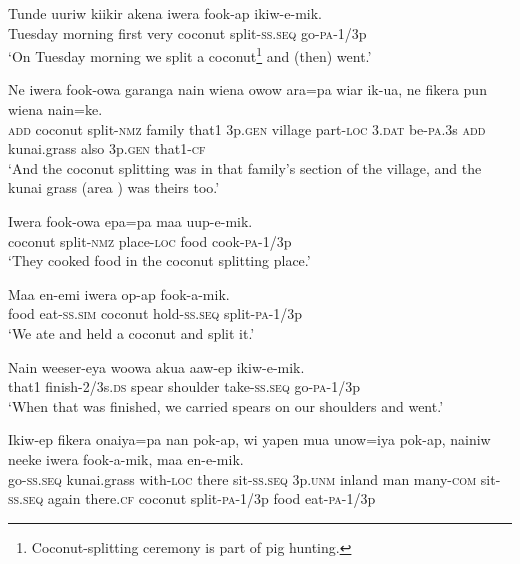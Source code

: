 \ea\label{ex:a:x2}
\gll  Tunde  uuriw  kiikir  akena  iwera  fook-ap  ikiw-e-mik. \\
Tuesday  morning  first  very  coconut  split-\textsc{ss.seq}  go-\textsc{pa}-1/3p \\
\glt ‘On Tuesday morning we split a coconut\footnote{ Coconut-splitting ceremony is part of pig hunting.} and (then) went.’ \\
\z


\ea\label{ex:a:x3}
\gll  Ne  iwera  fook-owa  garanga  nain  wiena  owow  ara=pa      wiar  ik-ua,  ne  fikera  pun  wiena  nain=ke. \\
\textsc{add}  coconut  split-\textsc{nmz}  family  that1  3p.\textsc{gen}  village  part-\textsc{loc}  3.\textsc{dat}  be-\textsc{pa}.3s  \textsc{add}  kunai.grass  also  3p.\textsc{gen}  that1-\textsc{cf} \\


\glt ‘And the coconut splitting was in that family’s section of the village, and the kunai grass (area ) was theirs too.’ \\
\z


\ea\label{ex:a:x4}
\gll  Iwera  fook-owa  epa=pa  maa  uup-e-mik. \\
coconut  split-\textsc{nmz}  place-\textsc{loc}  food  cook-\textsc{pa}-1/3p \\
\glt ‘They cooked food in the coconut splitting place.’ \\
\z


\ea\label{ex:a:x5}
\gll  Maa  en-emi  iwera  op-ap  fook-a-mik. \\
food  eat-\textsc{ss}.\textsc{sim}  coconut  hold-\textsc{ss.seq}  split-\textsc{pa}-1/3p \\
\glt ‘We ate and held a coconut and split it.’ \\
\z


\ea\label{ex:a:x6}
\gll  Nain  weeser-eya  woowa  akua  aaw-ep  ikiw-e-mik. \\
that1  finish-2/3s.\textsc{ds}  spear  shoulder  take-\textsc{ss.seq}  go-\textsc{pa}-1/3p \\
\glt ‘When that was finished, we carried spears on our shoulders and went.’ \\
\z


\ea\label{ex:a:x7}
\gll  Ikiw-ep  fikera  onaiya=pa  nan  pok-ap,  wi  yapen  mua            unow=iya  pok-ap,  nainiw  neeke  iwera  fook-a-mik,           maa  en-e-mik. \\
go-\textsc{ss.seq}  kunai.grass  with-\textsc{loc}  there  sit-\textsc{ss.seq}  3p.\textsc{unm}  inland  man  many-\textsc{com}  sit-\textsc{ss.seq}  again  there.\textsc{cf}  coconut  split-\textsc{pa}-1/3p  food  eat-\textsc{pa}-1/3p \\




